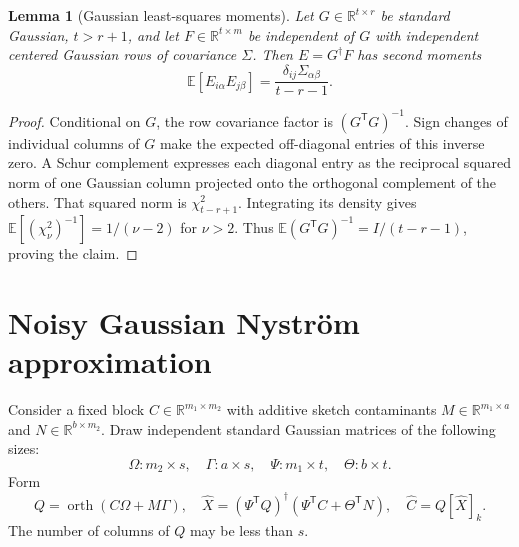 \documentclass[11pt]{article}
\newtheorem{lemma}[theorem]{Lemma}
\theoremstyle{remark}
\newcommand{\R}{\mathbb R}
\newcommand{\E}{\mathbb E}
\DeclareMathOperator{\orth}{orth}
\begin{document}
\begin{lemma}[Gaussian least-squares moments]\label{lem:regression}
Let $G\in\R^{t\times r}$ be standard Gaussian, $t>r+1$, and let
$F\in\R^{t\times m}$ be independent of $G$ with independent centered Gaussian
rows of covariance $\Sigma$. Then $E=G^\dagger F$ has second moments
\[
 \E[E_{i\alpha}E_{j\beta}]
 =\frac{\delta_{ij}\Sigma_{\alpha\beta}}{t-r-1}.
\]
\end{lemma}
\begin{proof}
Conditional on $G$, the row covariance factor is $(G^{\mathsf T}G)^{-1}$.
Sign changes of individual columns of $G$ make the expected off-diagonal
entries of this inverse zero. A Schur complement expresses each diagonal
entry as the reciprocal squared norm of one Gaussian column projected onto
the orthogonal complement of the others. That squared norm is
$\chi^2_{t-r+1}$. Integrating its density gives
$\E[(\chi^2_\nu)^{-1}]=1/(\nu-2)$ for $\nu>2$.
Thus $\E(G^{\mathsf T}G)^{-1}=I/(t-r-1)$, proving the claim.
\end{proof}

\section{Noisy Gaussian Nystr\"om approximation}\label{sec:nystrom}

Consider a fixed block $C\in\R^{m_1\times m_2}$ with additive sketch
contaminants $M\in\R^{m_1\times a}$ and $N\in\R^{b\times m_2}$.
Draw independent standard Gaussian matrices of the following sizes:
\[
 \Omega:m_2\times s,\quad \Gamma:a\times s,\quad
 \Psi:m_1\times t,\quad \Theta:b\times t.
\]
Form
\begin{equation}\label{eq:gn}
 Q=\orth(C\Omega+M\Gamma),\quad
 \widehat X=(\Psi^{\mathsf T}Q)^\dagger
              (\Psi^{\mathsf T}C+\Theta^{\mathsf T}N),\quad
 \widehat C=Q[\widehat X]_k.
\end{equation}
The number of columns of $Q$ may be less than $s$.
\end{document}
